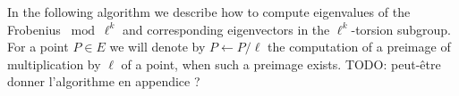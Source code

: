 \documentclass{lms}
\newcommand{\todo}[1]{{\color{red}TODO: #1}}
\begin{document}

In the following algorithm we describe how to compute eigenvalues of
the Frobenius $\bmod \ell^k$ and
corresponding eigenvectors in the $\ell^{k}$-torsion subgroup.
For a point $P \in E$ we will denote by $P \leftarrow P/\ell$ the computation of a preimage of multiplication by $\ell$ of a point, when such a preimage exists.
\todo{peut-être donner l'algorithme en appendice ?}
\end{document}

